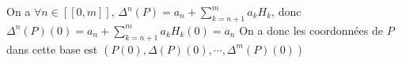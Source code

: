 \documentclass[a4paper,12pt]{book}
\begin{document}




On a $\forall n \in [\![0,m]\!]$, $\Delta^n(P)=a_n+\sum_{k=n+1}^ma_kH_k$, donc 
$\Delta^n(P)(0)=a_n+\sum_{k=n+1}^ma_kH_k(0)=a_n$
On a donc les coordonnées de $P$ dans cette base est $\boxed{(P(0),\Delta(P)(0),\cdots,\Delta^m(P)(0))}$
\end{document}
